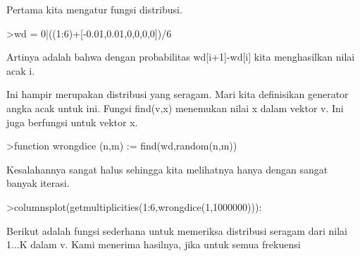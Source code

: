 \documentclass[a4paper,10pt]{article}
\begin{document}
\begin{eulernotebook}
\begin{eulercomment}
Pertama kita mengatur fungsi distribusi.
\end{eulercomment}
\begin{eulerprompt}
>wd = 0|((1:6)+[-0.01,0.01,0,0,0,0])/6
\end{eulerprompt}
\begin{euleroutput}
  [0,  0.165,  0.335,  0.5,  0.666667,  0.833333,  1]
\end{euleroutput}
\begin{eulercomment}
Artinya adalah bahwa dengan probabilitas wd[i+1]-wd[i] kita
menghasilkan nilai acak i.

Ini hampir merupakan distribusi yang seragam. Mari kita definisikan
generator angka acak untuk ini. Fungsi find(v,x) menemukan nilai x
dalam vektor v. Ini juga berfungsi untuk vektor x.
\end{eulercomment}
\begin{eulerprompt}
>function wrongdice (n,m) := find(wd,random(n,m))
\end{eulerprompt}
\begin{eulercomment}
Kesalahannya sangat halus sehingga kita melihatnya hanya dengan sangat
banyak iterasi.
\end{eulercomment}
\begin{eulerprompt}
>columnsplot(getmultiplicities(1:6,wrongdice(1,1000000))):
\end{eulerprompt}
\begin{eulercomment}
Berikut adalah fungsi sederhana untuk memeriksa distribusi seragam
dari nilai 1...K dalam v. Kami menerima hasilnya, jika untuk semua
frekuensi


\end{eulercomment}
\end{eulernotebook}
\end{document}
